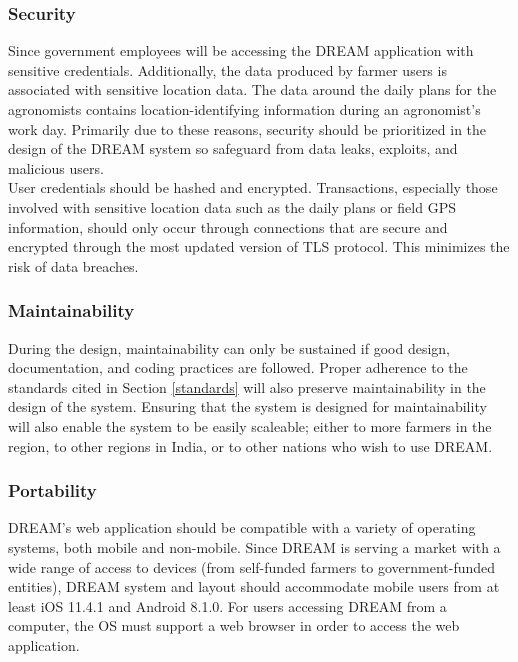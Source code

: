 \subsubsection{Security}
\begin{flushleft}
Since government employees will be accessing the DREAM application with sensitive credentials. Additionally, the data produced by farmer users is associated with sensitive location data. The data around the daily plans for the agronomists contains location-identifying information during an agronomist's work day. Primarily due to these reasons, security should be prioritized in the design of the DREAM system so safeguard from data leaks, exploits, and malicious users.\smallskip\\
User credentials should be hashed and encrypted. Transactions, especially those involved with sensitive location data such as the daily plans or field GPS information, should only occur through connections that are secure and encrypted through the most updated version of TLS protocol. This minimizes the risk of data breaches.
\end{flushleft}

\subsubsection{Maintainability}
\begin{flushleft}
During the design, maintainability can only be sustained if good design, documentation, and coding practices are followed. Proper adherence to the standards cited in Section \ref{standards} will also preserve maintainability in the design of the system. Ensuring that the system is designed for maintainability will also enable the system to be easily scaleable; either to more farmers in the region, to other regions in India, or to other nations who wish to use DREAM.
\end{flushleft}

\subsubsection{Portability}
\begin{flushleft}
DREAM's web application should be compatible with a variety of operating systems, both mobile and non-mobile. Since DREAM is serving a market with a wide range of access to devices (from self-funded farmers to government-funded entities), DREAM system and layout should accommodate mobile users from at least iOS 11.4.1 and Android 8.1.0. For users accessing DREAM from a computer, the OS must support a web browser in order to access the web application.
\end{flushleft}

